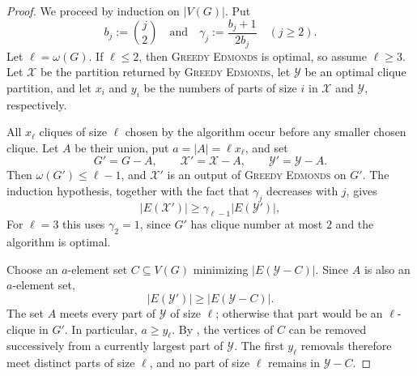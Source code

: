 \documentclass[a4paper,fleqn]{cas-sc}
\theoremstyle{remark}
\theoremstyle{plain}
\newcommand{\edmonds}{{\textsc{Greedy Edmonds}}}
\begin{document}
\begin{proof}
We proceed by induction on $|V(G)|$. Put
\[
   b_j:=\binom{j}{2}
   \quad\text{and}\quad
   \gamma_j:=\frac{b_j+1}{2b_j}\quad(j\geq 2).
\]
Let $\ell=\omega(G)$. If $\ell\leq 2$, then \edmonds{} is optimal,
so assume $\ell\geq 3$. Let $\mathcal{X}$ be the partition returned
by \edmonds{}, let $\mathcal{Y}$ be an optimal clique partition, and
let $x_i$ and $y_i$ be the numbers of parts of size $i$ in
$\mathcal{X}$ and $\mathcal{Y}$, respectively.

All $x_\ell$ cliques of size $\ell$ chosen by the algorithm occur
before any smaller chosen clique. Let $A$ be their union, put
$a=|A|=\ell x_\ell$, and set
\[
   G'=G-A,\qquad
   \mathcal{X}'=\mathcal{X}-A,\qquad
   \mathcal{Y}'=\mathcal{Y}-A.
\]
Then $\omega(G')\leq\ell-1$, and $\mathcal{X}'$ is an output of
\edmonds{} on $G'$. The induction hypothesis, together with the fact
that $\gamma_j$ decreases with $j$, gives
\begin{equation} \label{eq:induction-remainder}
   |E(\mathcal{X}')|\geq \gamma_{\ell-1}|E(\mathcal{Y}')|,
\end{equation}
For $\ell=3$ this uses $\gamma_2=1$, since $G'$ has clique number at
most $2$ and the algorithm is optimal.

Choose an $a$-element set $C\subseteq V(G)$ minimizing
$|E(\mathcal{Y}-C)|$. Since $A$ is also an $a$-element set,
\[
   |E(\mathcal{Y}')|\geq |E(\mathcal{Y}-C)|.
\]
The set $A$ meets every part of $\mathcal{Y}$ of size $\ell$;
otherwise that part would be an $\ell$-clique in $G'$. In particular,
$a\geq y_\ell$. By , the vertices of $C$ can be
removed successively from a currently largest part of
$\mathcal{Y}$. The first $y_\ell$ removals therefore meet distinct
parts of size $\ell$, and no part of size $\ell$ remains in
$\mathcal{Y}-C$.


\end{proof}
\end{document}

